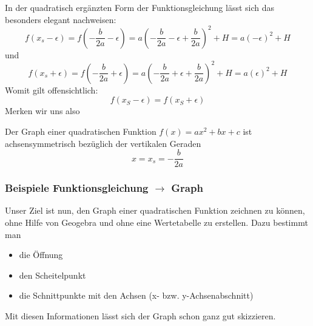 \begin{center}
\end{center}
In der quadratisch ergänzten Form der Funktionsgleichung lässt sich das besonders elegant nachweisen:
\[
    f(x_s-\epsilon)=f(-\frac{b}{2a}-\epsilon)=a\left(-\frac{b}{2a}-\epsilon+\frac{b}{2a}\right)^2+H=a(-\epsilon)^2+H
\]
und
\[
    f(x_s+\epsilon)=f(-\frac{b}{2a}+\epsilon)=a\left(-\frac{b}{2a}+\epsilon+\frac{b}{2a}\right)^2+H=a(\epsilon)^2+H
\]
Womit gilt offensichtlich:
\[
    f(x_S - \epsilon) = f(x_S + \epsilon)
\]
Merken wir uns also
\medskip

\begin{theo}{}
    Der Graph einer quadratischen Funktion $f(x)=ax^2+bx+c$ ist achsensymmetrisch bezüglich der vertikalen Geraden
    \[
        x=x_s=-\frac{b}{2a}
    \]
\end{theo}
\newpage

\subsubsection{Beispiele Funktionsgleichung $\rightarrow$ Graph}
Unser Ziel ist nun, den Graph einer quadratischen Funktion zeichnen zu können, ohne Hilfe von Geogebra und ohne eine Wertetabelle zu erstellen. Dazu bestimmt man
\begin{itemize}
    \item die Öffnung
    \item den Scheitelpunkt
    \item die Schnittpunkte mit den Achsen (x- bzw. y-Achsenabschnitt)
\end{itemize}
Mit diesen Informationen lässt sich der Graph schon ganz gut skizzieren.
